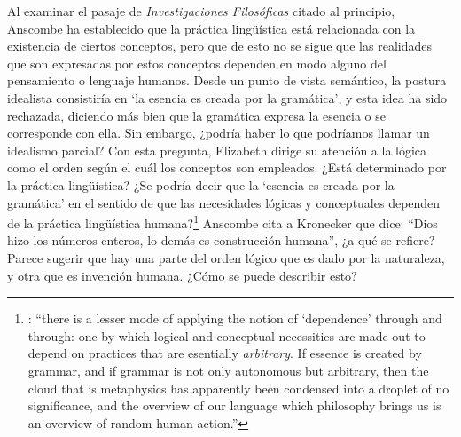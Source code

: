 Al examinar el pasaje de \emph{Investigaciones Filosóficas} citado al principio, Anscombe ha establecido que la práctica lingüística está relacionada con la existencia de ciertos conceptos, pero que de esto no se sigue que las realidades que son expresadas por estos conceptos dependen en modo alguno del pensamiento o lenguaje humanos. Desde un punto de vista semántico, la postura idealista consistiría en \enquote*{la esencia es creada por la gramática}, y esta idea ha sido rechazada, diciendo más bien que la gramática expresa la esencia o se corresponde con ella. Sin embargo, ¿podría haber lo que podríamos llamar un idealismo parcial? Con esta pregunta, Elizabeth dirige su atención a la lógica como el orden según el cuál los conceptos son empleados. ¿Está determinado por la práctica lingüística? ¿Se podría decir que la \enquote*{esencia es creada por la gramática} en el sentido de que las necesidades lógicas y conceptuales dependen de la práctica lingüística humana?\footnote{\cite[Cf.~][220]{teichmann2008ans}: \enquote{there is a lesser mode of applying the notion of `dependence' through and through: one by which logical and conceptual necessities are made out to depend on practices that are esentially \emph{arbitrary}. If essence is created by grammar, and if grammar is not only autonomous but arbitrary, then the cloud that is metaphysics has apparently been condensed into a droplet of no significance, and the overview of our language which philosophy brings us is an overview of random human action.}} Anscombe cita a Kronecker que dice: \enquote{Dios hizo los números enteros, lo demás es construcción humana}, ¿a qué se refiere? Parece sugerir que hay una parte del orden lógico que es dado por la naturaleza, y otra que es invención humana. ¿Cómo se puede describir esto?

